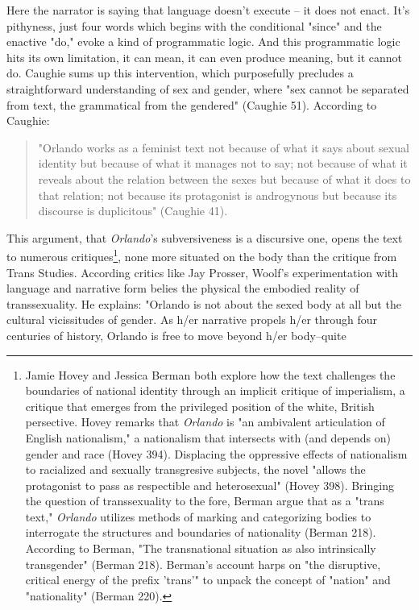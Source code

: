 \documentclass[11pt]{article}
\begin{document}
Here the narrator is saying that language doesn't execute -- it does
not enact. It's pithyness, just four words which begins with the
conditional "since" and the enactive "do," evoke a kind of
programmatic logic. And this programmatic logic hits its own
limitation, it can mean, it can even produce meaning, but it cannot
do. Caughie sums up this intervention, which purposefully precludes a
straightforward understanding of sex and gender, where "sex cannot be
separated from text, the grammatical from the gendered" (Caughie
51). According to Caughie:
\begin{quote}
"Orlando works as a feminist text not because of what it says about
sexual identity but because of what it manages not to say; not because
of what it reveals about the relation between the sexes but because of
what it does to that relation; not because its protagonist is
androgynous but because its discourse is duplicitous" (Caughie 41).
\end{quote}
This argument, that \emph{Orlando}'s subversiveness is a discursive one,
opens the text to numerous critiques\footnote{Jamie Hovey and Jessica Berman both explore how the text
challenges the boundaries of national identity through an implicit
critique of imperialism, a critique that emerges from the privileged
position of the white, British persective. Hovey remarks that
\emph{Orlando} is "an ambivalent articulation of English nationalism," a
nationalism that intersects with (and depends on) gender and race
(Hovey 394). Displacing the oppressive effects of nationalism to
racialized and sexually transgresive subjects, the novel "allows the
protagonist to pass as respectible and heterosexual" (Hovey
398). Bringing the question of transsexuality to the fore, Berman
argue that as a "trans text," \emph{Orlando} utilizes methods of marking
and categorizing bodies to interrogate the structures and boundaries
of nationality (Berman 218). According to Berman, "The transnational
situation as also intrinsically transgender" (Berman 218). Berman's
account harps on "the disruptive, critical energy of the prefix
'trans'" to unpack the concept of "nation" and "nationality" (Berman
220).}, none more situated on the
body than the critique from Trans Studies. According critics like Jay
Prosser, Woolf's experimentation with language and narrative form
belies the physical the embodied reality of transsexuality. He
explains: "Orlando is not about the sexed body at all but the cultural
vicissitudes of gender. As h/er narrative propels h/er through four
centuries of history, Orlando is free to move beyond h/er body--quite
\end{document}
